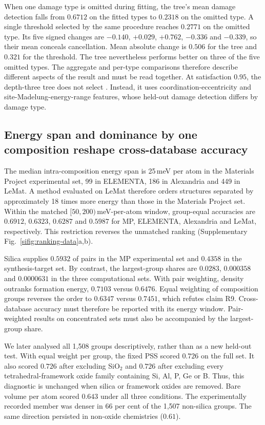 When one damage type is omitted during fitting, the tree's mean damage detection falls
from $0.6712$ on the fitted types to $0.2318$ on the omitted type. A single \rhoc{}
threshold selected by the same procedure reaches $0.2771$ on the omitted type. Its five
signed changes are $-0.140$, $+0.029$, $+0.762$, $-0.336$ and $-0.339$, so their mean
conceals cancellation. Mean absolute change is $0.506$ for the tree and $0.321$ for the
threshold. The tree nevertheless performs better on three of the five omitted types.
The aggregate and per-type comparisons therefore describe different aspects of the
result and must be read together. At satisfaction $0.95$, the depth-three tree does not
select \rhoc{}. Instead, it uses coordination-eccentricity and
site-Madelung-energy-range features, whose held-out damage detection differs by damage
type.

\subsection{Energy span and dominance by one composition reshape cross-database accuracy}

The median intra-composition energy span is 25\,meV per atom in the Materials Project
experimental set, 99 in ELEMENTA, 186 in Alexandria and 449 in LeMat. A method evaluated
on LeMat therefore orders structures separated by approximately 18 times more energy
than those in the Materials Project set. Within the matched
$[50, 200)$\,meV-per-atom window, group-equal accuracies are $0.6912$, $0.6323$,
$0.6287$ and $0.5987$ for MP, ELEMENTA, Alexandria and LeMat, respectively. This
restriction reverses the unmatched ranking (Supplementary
Fig.~\ref{sifig:ranking-data}a,b).

Silica supplies $0.5932$ of pairs in the MP experimental set and $0.4358$ in the
synthesis-target set. By contrast, the largest-group shares are $0.0283$, $0.000358$
and $0.0000631$ in the three computational sets. With pair weighting, density outranks
formation energy, $0.7103$ versus $0.6476$. Equal weighting of composition groups reverses
the order to $0.6347$ versus $0.7451$, which refutes claim R9. Cross-database accuracy
must therefore be reported with its energy window. Pair-weighted results on concentrated
sets must also be accompanied by the largest-group share.

We later analysed all 1{,}508 groups descriptively, rather than as a new held-out test.
With equal weight per group, the fixed PSS scored $0.726$ on the full set. It also scored
$0.726$ after excluding SiO$_2$ and $0.726$ after excluding every tetrahedral-framework
oxide family containing Si, Al, P, Ge or B. Thus, this diagnostic is unchanged when
silica or framework oxides are removed. Bare volume per atom scored $0.643$ under all
three conditions. The experimentally recorded member was denser in 66 per cent of the
1{,}507 non-silica groups. The same direction persisted in non-oxide chemistries
($0.61$).

